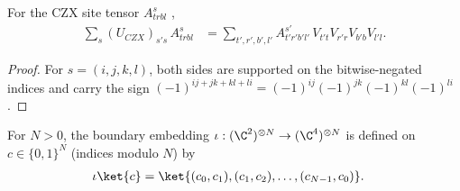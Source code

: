 \begin{lemma}%
    \label{thm:peps_czx_pull_through}
    \leanok
    For the CZX site tensor $A^s_{trbl}$
    \cite[Section~III.B, ``Non-injective PEPS: SPT phases'']{Cirac2021Matrix},
    \begin{align}
        \sum_s(U_{CZX})_{s's}\,A^s_{trbl}
         & =\sum_{t',r',b',l'}A^{s'}_{t'r'b'l'}\,V_{t't}V_{r'r}V_{b'b}V_{l'l}.
        \label{eq:peps_czx_pull_through}
    \end{align}
\end{lemma}

\begin{proof}\leanok
    For $s=(i,j,k,l)$, both sides are supported on the bitwise-negated indices
    and carry the sign $(-1)^{ij+jk+kl+li}=(-1)^{ij}(-1)^{jk}(-1)^{kl}(-1)^{li}$.
\end{proof}

\begin{definition}%
    \label{def:peps_czx_boundary_embedding}
    \leanok
    For $N>0$, the boundary embedding $\iota:(\C^2)^{\otimes N}\to(\C^4)^{\otimes N}$
    is defined on $c\in\{0,1\}^N$ (indices modulo $N$) by
    \begin{align}
        \iota\ket{c} & =\ket{(c_0,c_1),(c_1,c_2),\dots,(c_{N-1},c_0)}.
        \label{eq:peps_czx_boundary_embedding}
    \end{align}
\end{definition}

